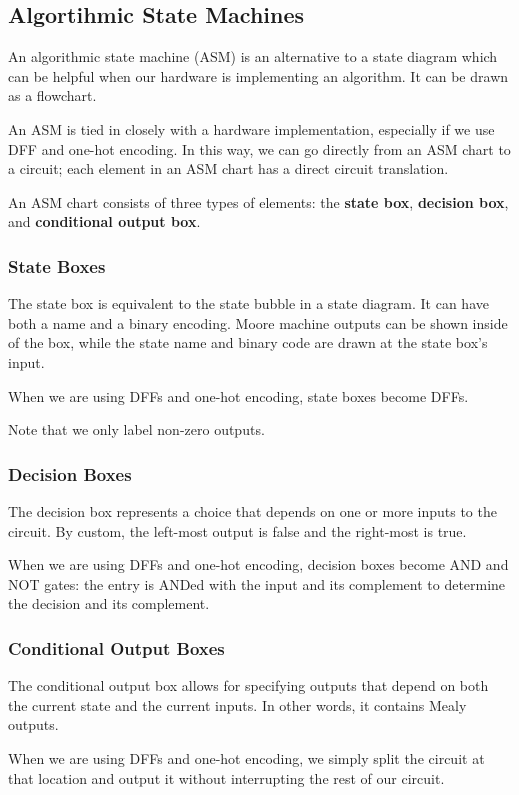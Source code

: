 \documentclass[12pt]{article}
\begin{document}
\subsection*{Algortihmic State Machines}
An algorithmic state machine (ASM) is an alternative to a state diagram which can be helpful when our hardware is implementing an algorithm. It can be drawn as a flowchart.

An ASM is tied in closely with a hardware implementation, especially if we use DFF and one-hot encoding. In this way, we can go directly from an ASM chart to a circuit; each element in an ASM chart has a direct circuit translation.

An ASM chart consists of three types of elements: the {\bf state box}, {\bf decision box}, and {\bf conditional output box}.

\subsubsection*{State Boxes}
The state box is equivalent to the state bubble in a state diagram. It can have both a name and a binary encoding. Moore machine outputs can be shown inside of the box, while the state name and binary code are drawn at the state box's input.

When we are using DFFs and one-hot encoding, state boxes become DFFs.

Note that we only label non-zero outputs.

\subsubsection*{Decision Boxes}
The decision box represents a choice that depends on one or more inputs to the circuit. By custom, the left-most output is false and the right-most is true.

When we are using DFFs and one-hot encoding, decision boxes become AND and NOT gates: the entry is ANDed with the input and its complement to determine the decision and its complement.

\subsubsection*{Conditional Output Boxes}
The conditional output box allows for specifying outputs that depend on both the current state and the current inputs. In other words, it contains Mealy outputs.

When we are using DFFs and one-hot encoding, we simply split the circuit at that location and output it without interrupting the rest of our circuit.
\end{document}

